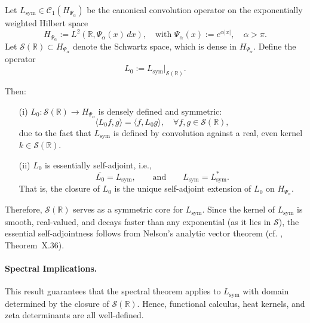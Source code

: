 \begin{lemma}
\label{lem:core_essential_sa}
Let \( L_{\mathrm{sym}} \in \mathcal{C}_1(H_{\Psi_\alpha}) \) be the canonical convolution operator on the exponentially weighted Hilbert space
\[
H_{\Psi_\alpha} := L^2(\mathbb{R}, \Psi_\alpha(x)\, dx), \quad \text{with } \Psi_\alpha(x) := e^{\alpha |x|}, \quad \alpha > \pi.
\]
Let \( \mathcal{S}(\mathbb{R}) \subset H_{\Psi_\alpha} \) denote the Schwartz space, which is dense in \( H_{\Psi_\alpha} \). Define the operator
\[
L_0 := L_{\mathrm{sym}}|_{\mathcal{S}(\mathbb{R})}.
\]

Then:
\begin{enumerate}
  \item[\textnormal{(i)}] \( L_0 \colon \mathcal{S}(\mathbb{R}) \to H_{\Psi_\alpha} \) is densely defined and symmetric:
  \[
  \langle L_0 f, g \rangle = \langle f, L_0 g \rangle, \quad \forall f, g \in \mathcal{S}(\mathbb{R}),
  \]
  due to the fact that \( L_{\mathrm{sym}} \) is defined by convolution against a real, even kernel \( k \in \mathcal{S}(\mathbb{R}) \).

  \item[\textnormal{(ii)}] \( L_0 \) is essentially self-adjoint, i.e.,
  \[
  \overline{L_0} = L_{\mathrm{sym}}, \qquad \text{and} \qquad L_{\mathrm{sym}} = L_{\mathrm{sym}}^*.
  \]
  That is, the closure of \( L_0 \) is the unique self-adjoint extension of \( L_0 \) on \( H_{\Psi_\alpha} \).
\end{enumerate}

\medskip
\noindent
Therefore, \( \mathcal{S}(\mathbb{R}) \) serves as a symmetric core for \( L_{\mathrm{sym}} \). Since the kernel of \( L_{\mathrm{sym}} \) is smooth, real-valued, and decays faster than any exponential (as it lies in \( \mathcal{S} \)), the essential self-adjointness follows from Nelson's analytic vector theorem (cf. \cite{ReedSimon1975II}, Theorem~X.36).

\paragraph{Spectral Implications.}
This result guarantees that the spectral theorem applies to \( L_{\mathrm{sym}} \) with domain determined by the closure of \( \mathcal{S}(\mathbb{R}) \). Hence, functional calculus, heat kernels, and zeta determinants are all well-defined.
\end{lemma}
